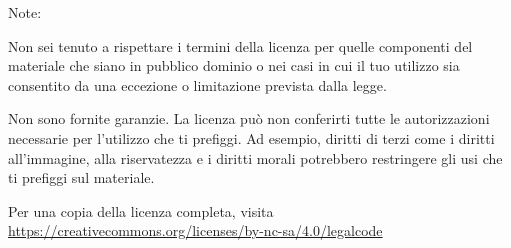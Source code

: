 \documentclass{report}
\begin{document}
Note:

Non sei tenuto a rispettare i termini della licenza per quelle componenti del materiale che siano in pubblico dominio o nei casi in cui il tuo utilizzo sia consentito da una eccezione o limitazione prevista dalla legge.

Non sono fornite garanzie. La licenza può non conferirti tutte le autorizzazioni necessarie per l'utilizzo che ti prefiggi. Ad esempio, diritti di terzi come i diritti all'immagine, alla riservatezza e i diritti morali potrebbero restringere gli usi che ti prefiggi sul materiale.

 Per una copia della licenza completa, visita \url{https://creativecommons.org/licenses/by-nc-sa/4.0/legalcode}
% 
% 
\end{document}
